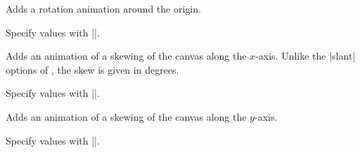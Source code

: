 \begin{command}{\pgfsys@animaterotate}
  Adds a rotation animation around the origin.
  
  Specify values with |\pgfsys@animation@scalar|.
\begin{codeexample}[width=2cm]
\end{codeexample}
\end{command}

\begin{command}{\pgfsys@animateskewx}
  Adds an animation of a skewing of the canvas along the
  $x$-axis. Unlike the |slant| options of \tikzname, the skew is given
  in degrees.
  
  Specify values with |\pgfsys@animation@scalar|.
\begin{codeexample}[width=2cm]
\end{codeexample}
\end{command}

\begin{command}{\pgfsys@animateskewy}
  Adds an animation of a skewing of the canvas along the $y$-axis.
  
  Specify values with |\pgfsys@animation@scalar|.
\end{command}

